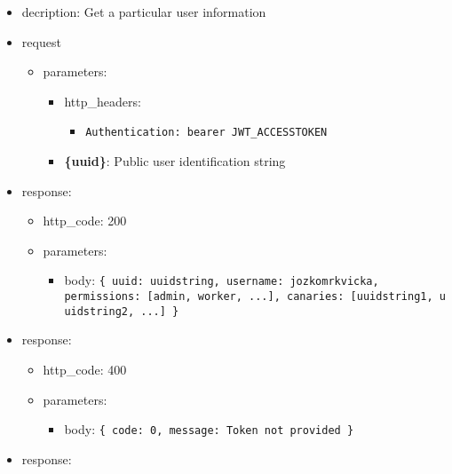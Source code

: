 \documentclass[
]{article}
\begin{document}
\begin{itemize}
\item
  decription: Get a particular user information
\item
  request

  \begin{itemize}
  \item
    parameters:

    \begin{itemize}
    \item
      http\_headers:

      \begin{itemize}
      \item
        \texttt{Authentication:\ \textquotesingle{}bearer\ JWT\_ACCESSTOKEN\textquotesingle{}}
      \end{itemize}
    \item
      \textbf{\{uuid\}}: Public user identification string
    \end{itemize}
  \end{itemize}
\item
  response:

  \begin{itemize}
  \item
    http\_code: 200
  \item
    parameters:

    \begin{itemize}
    \item
      body: \texttt{\{
      \textquotesingle{}uuid\textquotesingle{}:\ \textquotesingle{}uuidstring\textquotesingle{},
      \textquotesingle{}username\textquotesingle{}:\ \textquotesingle{}jozkomrkvicka\textquotesingle{},
      \textquotesingle{}permissions\textquotesingle{}:\ {[}\textquotesingle{}admin\textquotesingle{},\ \textquotesingle{}worker\textquotesingle{},\ ...{]},\ 
      \textquotesingle{}canaries\textquotesingle{}:\ {[}\textquotesingle{}uuidstring1\textquotesingle{},\ \textquotesingle{}uuidstring2\textquotesingle{},\ ...{]}
      \}}
    \end{itemize}
  \end{itemize}
\item
  response:

  \begin{itemize}
  \item
    http\_code: 400
  \item
    parameters:

    \begin{itemize}
    \item
      body: \texttt{\{
      \textquotesingle{}code\textquotesingle{}:\ 0,\ 
      \textquotesingle{}message\textquotesingle{}:\ \textquotesingle{}Token\ not\ provided\textquotesingle{}
      \}}
    \end{itemize}
  \end{itemize}
\item
  response:


\end{itemize}
\end{document}

